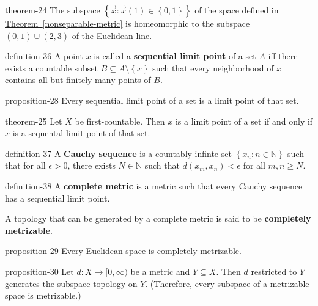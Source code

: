 \documentclass[10pt,]{article}
\newcommand{\terminology}[1]{\textbf{#1}}
\newcommand{\mb}{\mathbb}
\newcommand{\setBuilder}[2]{\left\{#1:#2\right\}}
\newcommand{\setList}[1]{\left\{#1\right\}}
\newcommand{\lt}{<}
\newcommand{\gt}{>}
\begin{document}
\begin{theorem}{}{}{theorem-24}%
\hypertarget{p-125}{}%
The subspace \(\setBuilder{\vec x}{\vec{x}(1)\in\setList{0,1}}\) of the space defined in \hyperref[nonseparable-metric]{Theorem~\ref{nonseparable-metric}} is homeomorphic to the subspace \((0,1)\cup(2,3)\) of the Euclidean line.%
\end{theorem}
\begin{definition}{}{definition-36}%
\hypertarget{p-126}{}%
A point \(x\) is called a \terminology{sequential limit point} of a set \(A\) iff there exists a countable subset \(B\subseteq A\setminus\setList{x}\) such that every neighborhood of \(x\) contains all but finitely many points of \(B\).%
\end{definition}
\begin{proposition}{}{}{proposition-28}%
\hypertarget{p-127}{}%
Every sequential limit point of a set is a limit point of that set.%
\end{proposition}
\begin{theorem}{}{}{theorem-25}%
\hypertarget{p-128}{}%
Let \(X\) be first-countable. Then \(x\) is a limit point of a set if and only if \(x\) is a sequental limit point of that set.%
\end{theorem}
\begin{definition}{}{definition-37}%
\hypertarget{p-129}{}%
A \terminology{Cauchy sequence} is a countably infinte set \(\setBuilder{x_n}{n\in\mb N}\) such that for all \(\epsilon\gt0\), there exists \(N\in\mb N\) such that \(d(x_m,x_n)\lt\epsilon\) for all \(m,n\geq N\).%
\end{definition}
\begin{definition}{}{definition-38}%
\hypertarget{p-130}{}%
A \terminology{complete metric} is a metric such that every Cauchy sequence has a sequential limit point.%
\par
\hypertarget{p-131}{}%
A topology that can be generated by a complete metric is said to be \terminology{completely metrizable}.%
\end{definition}
\begin{proposition}{}{}{proposition-29}%
\hypertarget{p-132}{}%
Every Euclidean space is completely metrizable.%
\end{proposition}
\begin{proposition}{}{}{proposition-30}%
\hypertarget{p-133}{}%
Let \(d:X\to[0,\infty)\) be a metric and \(Y\subseteq X\). Then \(d\) restricted to \(Y\) generates the subspace topology on \(Y\). (Therefore, every subspace of a metrizable space is metrizable.)%
\end{proposition}
\end{document}
